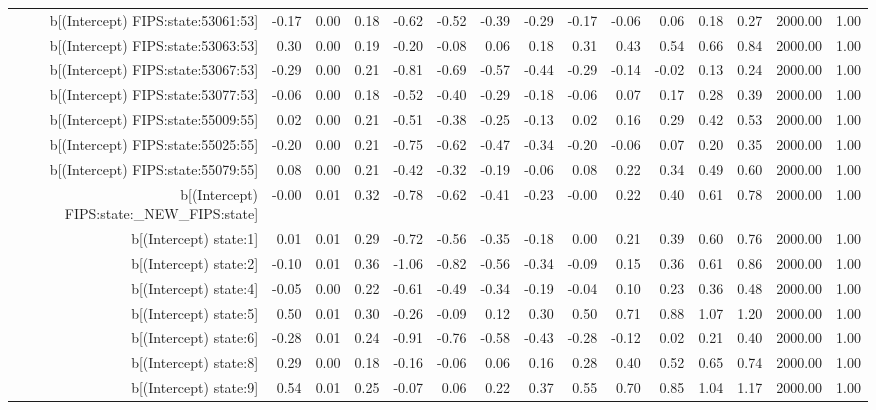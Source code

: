 \begin{table}[ht]
\begin{tabular}{rrrrrrrrrrrrrrr}
  b[(Intercept) FIPS:state:53061:53] & -0.17 & 0.00 & 0.18 & -0.62 & -0.52 & -0.39 & -0.29 & -0.17 & -0.06 & 0.06 & 0.18 & 0.27 & 2000.00 & 1.00 \\ 
  b[(Intercept) FIPS:state:53063:53] & 0.30 & 0.00 & 0.19 & -0.20 & -0.08 & 0.06 & 0.18 & 0.31 & 0.43 & 0.54 & 0.66 & 0.84 & 2000.00 & 1.00 \\ 
  b[(Intercept) FIPS:state:53067:53] & -0.29 & 0.00 & 0.21 & -0.81 & -0.69 & -0.57 & -0.44 & -0.29 & -0.14 & -0.02 & 0.13 & 0.24 & 2000.00 & 1.00 \\ 
  b[(Intercept) FIPS:state:53077:53] & -0.06 & 0.00 & 0.18 & -0.52 & -0.40 & -0.29 & -0.18 & -0.06 & 0.07 & 0.17 & 0.28 & 0.39 & 2000.00 & 1.00 \\ 
  b[(Intercept) FIPS:state:55009:55] & 0.02 & 0.00 & 0.21 & -0.51 & -0.38 & -0.25 & -0.13 & 0.02 & 0.16 & 0.29 & 0.42 & 0.53 & 2000.00 & 1.00 \\ 
  b[(Intercept) FIPS:state:55025:55] & -0.20 & 0.00 & 0.21 & -0.75 & -0.62 & -0.47 & -0.34 & -0.20 & -0.06 & 0.07 & 0.20 & 0.35 & 2000.00 & 1.00 \\ 
  b[(Intercept) FIPS:state:55079:55] & 0.08 & 0.00 & 0.21 & -0.42 & -0.32 & -0.19 & -0.06 & 0.08 & 0.22 & 0.34 & 0.49 & 0.60 & 2000.00 & 1.00 \\ 
  b[(Intercept) FIPS:state:\_NEW\_FIPS:state] & -0.00 & 0.01 & 0.32 & -0.78 & -0.62 & -0.41 & -0.23 & -0.00 & 0.22 & 0.40 & 0.61 & 0.78 & 2000.00 & 1.00 \\ 
  b[(Intercept) state:1] & 0.01 & 0.01 & 0.29 & -0.72 & -0.56 & -0.35 & -0.18 & 0.00 & 0.21 & 0.39 & 0.60 & 0.76 & 2000.00 & 1.00 \\ 
  b[(Intercept) state:2] & -0.10 & 0.01 & 0.36 & -1.06 & -0.82 & -0.56 & -0.34 & -0.09 & 0.15 & 0.36 & 0.61 & 0.86 & 2000.00 & 1.00 \\ 
  b[(Intercept) state:4] & -0.05 & 0.00 & 0.22 & -0.61 & -0.49 & -0.34 & -0.19 & -0.04 & 0.10 & 0.23 & 0.36 & 0.48 & 2000.00 & 1.00 \\ 
  b[(Intercept) state:5] & 0.50 & 0.01 & 0.30 & -0.26 & -0.09 & 0.12 & 0.30 & 0.50 & 0.71 & 0.88 & 1.07 & 1.20 & 2000.00 & 1.00 \\ 
  b[(Intercept) state:6] & -0.28 & 0.01 & 0.24 & -0.91 & -0.76 & -0.58 & -0.43 & -0.28 & -0.12 & 0.02 & 0.21 & 0.40 & 2000.00 & 1.00 \\ 
  b[(Intercept) state:8] & 0.29 & 0.00 & 0.18 & -0.16 & -0.06 & 0.06 & 0.16 & 0.28 & 0.40 & 0.52 & 0.65 & 0.74 & 2000.00 & 1.00 \\ 
  b[(Intercept) state:9] & 0.54 & 0.01 & 0.25 & -0.07 & 0.06 & 0.22 & 0.37 & 0.55 & 0.70 & 0.85 & 1.04 & 1.17 & 2000.00 & 1.00 \\ 

\end{tabular}
\end{table}
